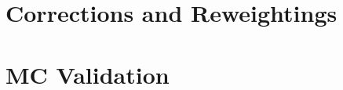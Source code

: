 \documentclass[12pt,a4paper,reqno,twoside,final]{scrbook}%
\numberwithin{equation}{subsection}
\begin{document}
 \chapter{Corrections and Reweightings}
 \label{app:corrrew}
 
 

 \chapter{MC Validation}
\label{app:mcvalidation}
 


\listoffigures
\listoftables

 
 
 
 \newpage
 
\end{document}
